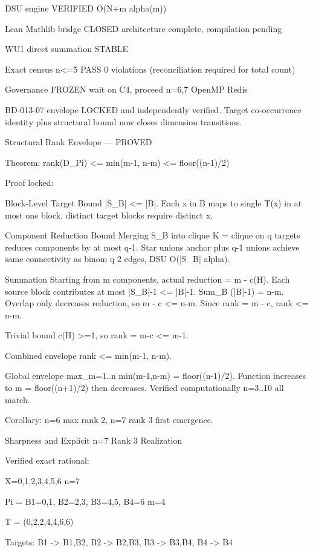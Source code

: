 DSU engine VERIFIED O(N+m alpha(m))

Lean Mathlib bridge CLOSED architecture complete, compilation pending

WU1 direct summation STABLE

Exact census n<=5 PASS 0 violations (reconciliation required for total count)

Governance FROZEN wait on C4, proceed n=6,7 OpenMP Redis


BD-013-07 envelope LOCKED and independently verified. Target co-occurrence identity plus structural bound now closes dimension transitions.




Structural Rank Envelope — PROVED




Theorem: rank(D_Pi) <= min(m-1, n-m) <= floor((n-1)/2)


Proof locked:


Block-Level Target Bound |S_B| <= |B|. Each x in B maps to single T(x) in at most one block, distinct target blocks require distinct x.


Component Reduction Bound Merging S_B into clique K = clique on q targets reduces components by at most q-1. Star unions anchor plus q-1 unions achieve same connectivity as binom q 2 edges, DSU O(|S_B| alpha).


Summation Starting from m components, actual reduction = m - c(H). Each source block contributes at most |S_B|-1 <= |B|-1. Sum_B (|B|-1) = n-m. Overlap only decreases reduction, so m - c <= n-m. Since rank = m - c, rank <= n-m.


Trivial bound c(H) >=1, so rank = m-c <= m-1.


Combined envelope rank <= min(m-1, n-m).


Global envelope max_{m=1..n} min(m-1,n-m) = floor((n-1)/2). Function increases to m = floor((n+1)/2) then decreases. Verified computationally n=3..10 all match.


Corollary: n=6 max rank 2, n=7 rank 3 first emergence.




Sharpness and Explicit n=7 Rank 3 Realization




Verified exact rational:


X={0,1,2,3,4,5,6} n=7

Pi = {B1={0,1}, B2={2,3}, B3={4,5}, B4={6}} m=4

T = (0,2,2,4,4,6,6)


Targets: B1 -> {B1,B2}, B2 -> {B2,B3}, B3 -> {B3,B4}, B4 -> {B4}


